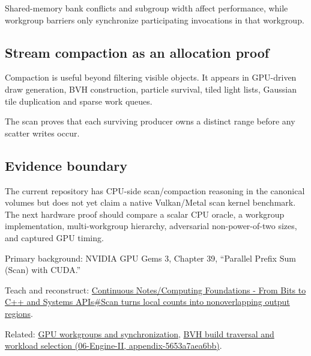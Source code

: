 Shared-memory bank conflicts and subgroup width affect performance, while workgroup barriers only synchronize participating invocations in that workgroup.

\subsection{Stream compaction as an allocation proof}\label{stream-compaction-as-an-allocation-proof}

Compaction is useful beyond filtering visible objects. It appears in GPU-driven draw generation, BVH construction, particle survival, tiled light lists, Gaussian tile duplication and sparse work queues.

The scan proves that each surviving producer owns a distinct range before any scatter writes occur.

\subsection{Evidence boundary}\label{evidence-boundary}

The current repository has CPU-side scan/compaction reasoning in the canonical volumes but does not yet claim a native Vulkan/Metal scan kernel benchmark. The next hardware proof should compare a scalar CPU oracle, a workgroup implementation, multi-workgroup hierarchy, adversarial non-power-of-two sizes, and captured GPU timing.

Primary background: NVIDIA GPU Gems 3, Chapter 39, ``Parallel Prefix Sum (Scan) with CUDA.''

Teach and reconstruct: \href{Continuous\%20Notes/Computing\%20Foundations\%20-\%20From\%20Bits\%20to\%20C++\%20and\%20Systems\%20APIs\#Scan\%20turns\%20local\%20counts\%20into\%20nonoverlapping\%20output\%20regions}{Continuous Notes/Computing Foundations - From Bits to C++ and Systems APIs\#Scan turns local counts into nonoverlapping output regions}.

Related: \hyperref[appendix-f662b5b1773b]{GPU workgroups and synchronization}, \href{}{BVH build traversal and workload selection (06-Engine-II, appendix-5653a7aea6bb)}.
